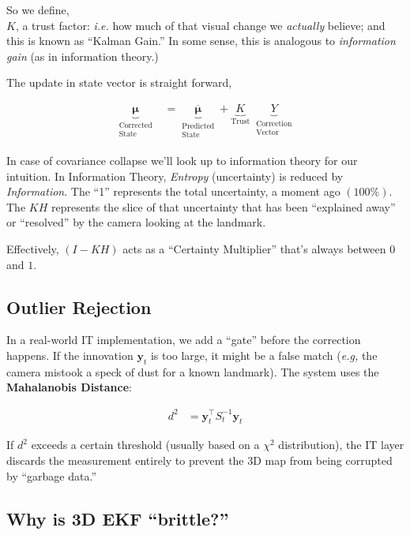 \documentclass[11pt]{article}
\begin{document}
So we define, \\
\(K\), a trust factor: \emph{i.e.} how much of that visual
change we \emph{actually} believe; and this is known as
``Kalman Gain.''  In some sense, this is analogous to
\emph{information gain} (as in information theory.)

The update in state vector is straight forward,

\begin{align*}
\underbrace{\boldsymbol{\mu}}_{\substack{\text{Corrected}
  \\ \text{State}}}
&= \underbrace{\overline{\boldsymbol{\mu}}}_{\substack{
  \text{Predicted} \\ \text{State}}} +
  \underbrace{K}_{\text{Trust}} \;
  \underbrace{Y}_{\substack{\text{Correction} \\
  \text{Vector}}}
\end{align*}

In case of covariance collapse we'll look up to
information theory for our intuition.  In Information
Theory, \emph{Entropy} (uncertainty) is reduced by
\emph{Information}.  The ``1'' represents the total
uncertainty, a moment ago \((100\%)\).  The \(KH\)
represents the slice of that uncertainty that has been
``explained away'' or ``resolved'' by the camera looking at
the landmark.



Effectively, \((I-KH)\) acts as a ``Certainty Multiplier''
that's always between \(0\) and \(1\).
\subsection{Outlier Rejection}
\label{sec:org2c81093}
In a real-world IT implementation, we add a ``gate''
before the correction happens. If the innovation
\(\mathbf{y}_t\) is too large, it might be a false match
(\emph{e.g,} the camera mistook a speck of dust for a known
landmark).  The system uses the \textbf{Mahalanobis Distance}:

\begin{align*}
  d^2
  &= \mathbf{y}_t^{\top} S_t^{-1} \mathbf{y}_t
\end{align*}

If \(d^2\) exceeds a certain threshold (usually based on
a \(\chi^2\) distribution), the IT layer discards the
measurement entirely to prevent the 3D map from being
corrupted by ``garbage data.''
\subsection{Why is 3D EKF ``brittle?''}
\label{sec:org31f4d5c}
\end{document}
